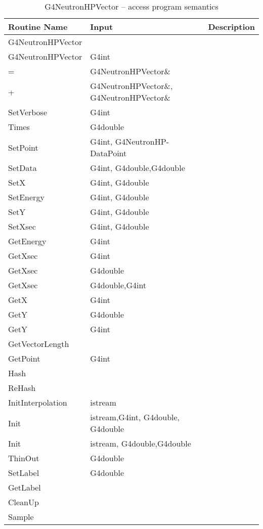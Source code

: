 \documentclass[12pt]{article}
\begin{document}
\begin{longtable}{p{}p{}p{}}
\caption{G4NeutronHPVector -- access program semantics}\label{Table_NeutronHPVectorSemantics}\\
\toprule
\bf Routine Name & \bf Input & \bf Description \\\midrule
\arrayrulecolor{lightgray}
G4NeutronHPVector & & \\\hline
G4NeutronHPVector & G4int & \\\hline
= & G4NeutronHPVector\& &  \\\hline
+ & G4NeutronHPVector\&, G4NeutronHPVector\&  & \\\hline
SetVerbose & G4int & \\\hline
Times & G4double & \\\hline
SetPoint & G4int, G4NeutronHP-DataPoint & \\\hline
SetData & G4int, G4double,G4double & \\\hline
SetX & G4int, G4double & \\\hline
SetEnergy & G4int, G4double & \\\hline
SetY & G4int, G4double & \\\hline
SetXsec & G4int, G4double & \\\hline
GetEnergy & G4int & \\\hline
GetXsec & G4int & \\\hline
GetXsec & G4double & \\\hline
GetXsec & G4double,G4int & \\\hline
GetX & G4int & \\\hline
GetY & G4double & \\\hline
GetY & G4int & \\\hline
GetVectorLength & & \\\hline
GetPoint & G4int & \\\hline
Hash & & \\\hline
ReHash & & \\\hline
InitInterpolation & istream & \\\hline
Init & istream,G4int, G4double, G4double & \\\hline
Init & istream, G4double,G4double & \\\hline
ThinOut & G4double & \\\hline
SetLabel & G4double & \\\hline
GetLabel & & \\\hline
CleanUp & & \\\hline
Sample & & \\\hline

\end{longtable}
\end{document}
